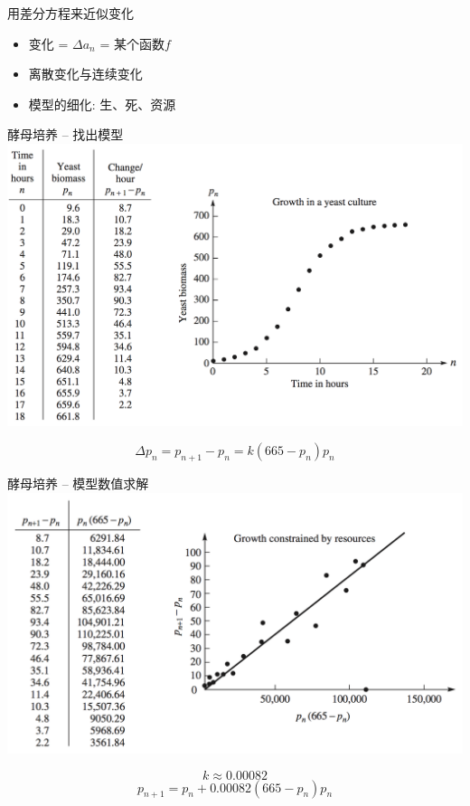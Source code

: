 \documentclass[
  ignorenonframetext,
]{ctexbeamer}
\begin{document}
\begin{frame}{用差分方程来近似变化}
\label{ux7528ux5deeux5206ux65b9ux7a0bux6765ux8fd1ux4f3cux53d8ux5316}
\begin{itemize}
\item
  变化 = \(\Delta a_n\) = 某个函数\(f\)
\item
  离散变化与连续变化
\item
  模型的细化: 生、死、资源
\end{itemize}
\end{frame}

\begin{frame}{酵母培养 -- 找出模型}
\label{ux9175ux6bcdux57f9ux517b-ux627eux51faux6a21ux578b}
\includegraphics{yeast.png}

\[\Delta p_n = p_{n+1} - p_n = k(665 - p_n)p_n\]
\end{frame}

\begin{frame}{酵母培养 -- 模型数值求解}
\label{ux9175ux6bcdux57f9ux517b-ux6a21ux578bux6570ux503cux6c42ux89e3}
\includegraphics{yeast-fit.png}

\[k \approx 0.00082\] \[p_{n+1} = p_n + 0.00082(665 - p_n)p_n\]
\end{frame}
\end{document}
